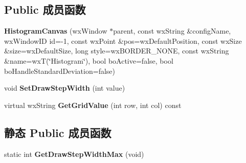 \subsection*{Public 成员函数}
\begin{DoxyCompactItemize}
\item 
\hypertarget{class_histogram_canvas_a00a1edc9ed490d20c329f1997ff42c3c}{{\bfseries Histogram\+Canvas} (wx\+Window $\ast$parent, const wx\+String \&config\+Name, wx\+Window\+I\+D id=-\/1, const wx\+Point \&pos=wx\+Default\+Position, const wx\+Size \&size=wx\+Default\+Size, long style=wx\+B\+O\+R\+D\+E\+R\+\_\+\+N\+O\+N\+E, const wx\+String \&name=wx\+T(\char`\"{}Histogram\char`\"{}), bool bo\+Active=false, bool bo\+Handle\+Standard\+Deviation=false)}\label{class_histogram_canvas_a00a1edc9ed490d20c329f1997ff42c3c}

\item 
\hypertarget{class_histogram_canvas_abd8e043031d61f66ed8e004b61fd4ec2}{void {\bfseries Set\+Draw\+Step\+Width} (int value)}\label{class_histogram_canvas_abd8e043031d61f66ed8e004b61fd4ec2}

\item 
\hypertarget{class_histogram_canvas_a81228502111e62f1d5df028b84ad95d4}{virtual wx\+String {\bfseries Get\+Grid\+Value} (int row, int col) const }\label{class_histogram_canvas_a81228502111e62f1d5df028b84ad95d4}

\end{DoxyCompactItemize}
\subsection*{静态 Public 成员函数}
\begin{DoxyCompactItemize}
\item 
\hypertarget{class_histogram_canvas_a6b1f6be56e1006fea521d1b4c3792611}{static int {\bfseries Get\+Draw\+Step\+Width\+Max} (void)}\label{class_histogram_canvas_a6b1f6be56e1006fea521d1b4c3792611}

\end{DoxyCompactItemize}
